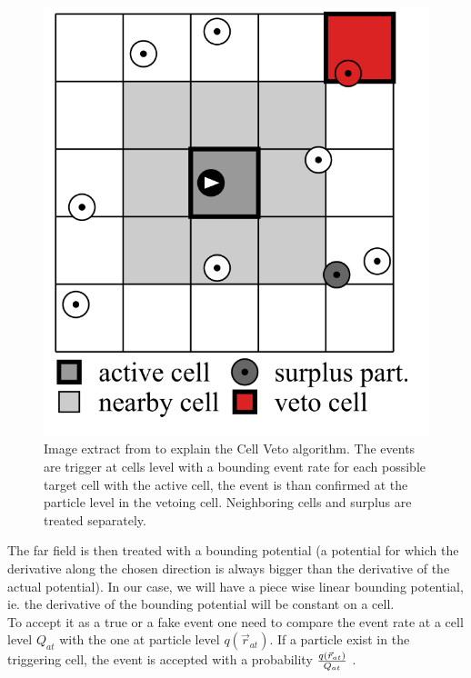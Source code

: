 \documentclass[jcp,twocolumn,longbibliography,superscriptaddress]{revtex4-2}
\begin{document}
	\begin{figure}[htb]
		\centering
		\includegraphics[width=0.7\columnwidth]{./Figures/CellVetoSchema.png}
		\caption{Image extract from \cite{KapferKrauth2016} to explain the Cell Veto algorithm. The events are trigger at cells level with a bounding event rate for each possible target cell with the active cell, the event is than confirmed at the particle level in the vetoing cell. Neighboring cells and surplus are treated separately.}
		\label{CVSchema}
	\end{figure}
	
	The far field is then treated with a bounding potential (a potential for which the derivative along the chosen direction is always bigger than the derivative of the actual potential). In our case, we will have a piece wise linear bounding potential, ie. the derivative of the bounding potential will be constant on a cell.\\
	
	To accept it as a true or a fake event one need to compare the event rate at a cell level $Q_{at}$  with the one at particle level $q(\vec{r}_{at})$. If a particle exist in the triggering cell, the event is accepted with a probability $\frac{q(\vec{r}_{at})}{Q_{at}}$ .\\ 
	
\end{document}

